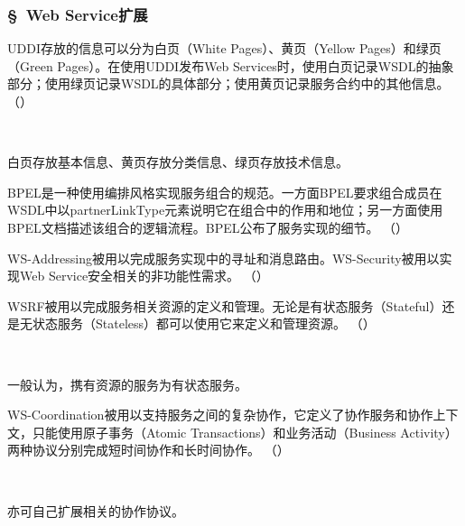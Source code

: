 \subsubsection*{\S\ Web Service扩展}
\setcounter{problemname}{0}

\begin{problem}
	UDDI存放的信息可以分为白页（White Pages）、黄页（Yellow Pages）和绿页（Green Pages）。在使用UDDI发布Web Services时，使用白页记录WSDL的抽象部分；使用绿页记录WSDL的具体部分；使用黄页记录服务合约中的其他信息。
	\hfill （）
\end{problem}
\\ \begin{solution}
	白页存放基本信息、黄页存放分类信息、绿页存放技术信息。
\end{solution}


\begin{problem}
	BPEL是一种使用编排风格实现服务组合的规范。一方面BPEL要求组合成员在WSDL中以partnerLinkType元素说明它在组合中的作用和地位；另一方面使用BPEL文档描述该组合的逻辑流程。BPEL公布了服务实现的细节。
	\hfill （）
\end{problem}

\begin{problem}
	WS-Addressing被用以完成服务实现中的寻址和消息路由。WS-Security被用以实现Web Service安全相关的非功能性需求。
	\hfill （）
\end{problem}


\begin{problem}
	WSRF被用以完成服务相关资源的定义和管理。无论是有状态服务（Stateful）还是无状态服务（Stateless）都可以使用它来定义和管理资源。
	\hfill （）
\end{problem}
\\ \begin{solution}
	一般认为，携有资源的服务为有状态服务。
\end{solution}


\begin{problem}
	WS-Coordination被用以支持服务之间的复杂协作，它定义了协作服务和协作上下文，只能使用原子事务（Atomic Transactions）和业务活动（Business Activity）两种协议分别完成短时间协作和长时间协作。
	\hfill （）
\end{problem}
\\ \begin{solution}
	亦可自己扩展相关的协作协议。
\end{solution}

